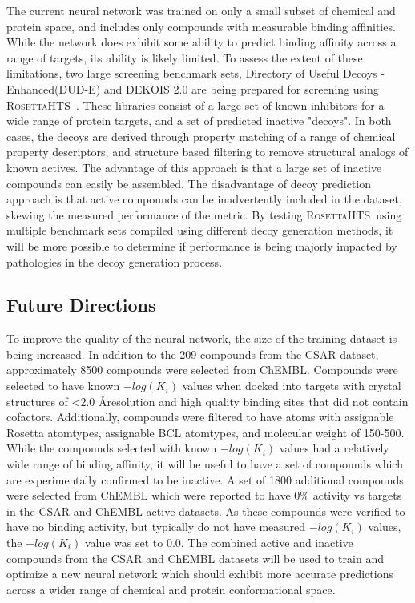 \documentclass[11pt, oneside]{article}   	%
\newcommand{\rhts}{\textsc{RosettaHTS}\ }
\begin{document}
The current neural network was trained on only a small subset of chemical and protein space, and includes only compounds with measurable binding affinities.  
While the network does exhibit some ability to predict binding affinity across a range of targets, its ability is likely limited. 
To assess the extent of these limitations, two large screening benchmark sets, Directory of Useful Decoys - Enhanced(DUD-E)\citep{Mysinger:2012hu} and DEKOIS 2.0\citep{Bauer:2013de} are being prepared for screening using \rhts.
These libraries consist of a large set of known inhibitors for a wide range of protein targets, and a set of predicted inactive "decoys".  
In both cases, the decoys are derived through property matching of a range of chemical property descriptors, and structure based filtering to remove structural analogs of known actives.   
The advantage of this approach is that a large set of inactive compounds can easily be assembled.
The disadvantage of decoy prediction approach is that active compounds can be inadvertently included in the dataset, skewing the measured performance of the metric.
By testing \rhts using multiple benchmark sets compiled using different decoy generation methods, it will be more possible to determine if performance is being majorly impacted by pathologies in the decoy generation process. 

\subsection{Future Directions}
To improve the quality of the neural network, the size of the training dataset is being increased.  
In addition to the 209 compounds from the CSAR dataset,  approximately 8500 compounds were selected from ChEMBL\citep{Gaulton:vaa}.
Compounds were selected to have known $-log(K_{i})$ values when docked into targets with crystal structures of \textless 2.0 \AA resolution and high quality binding sites that did not contain cofactors.
Additionally, compounds were filtered to have atoms with assignable Rosetta atomtypes, assignable BCL atomtypes, and molecular weight of 150-500.
While the compounds selected with known $-log(K_{i})$ values had a relatively wide range of binding affinity, it will be useful to have a set of compounds which are experimentally confirmed to be inactive.
A set of 1800 additional compounds were selected from ChEMBL which were reported to have 0\% activity vs targets in the CSAR and ChEMBL active datasets.
As these compounds were verified to have no binding activity, but typically do not have measured $-log(K_{i})$ values, the $-log(K_{i})$ value was set to 0.0. 
The combined active and inactive compounds from the CSAR and ChEMBL datasets will be used to train and optimize a new neural network which should exhibit more accurate predictions across a wider range of chemical and protein conformational space. 
\end{document}
